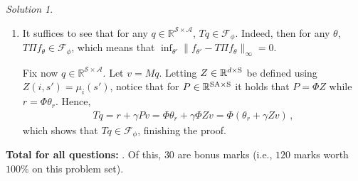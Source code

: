 \documentclass{article}
\newcommand{\R}{\mathbb{R}}
\DeclareMathOperator*{\1}{\mathbbm{1}}
\newcommand{\cF}{\mathcal{F}}
\newcommand{\0}{\mathbf{0}}
\newcounter{DocPoints} %
\theoremstyle{definition}
\newtheorem{question}{Question}
\theoremstyle{remark}
\newtheorem*{solution*}{Solution}
\theoremstyle{theorem}
\newcommand{\cS}{\mathcal{S}}
\newcommand{\cA}{\mathcal{A}}
\begin{document}
\begin{solution*}
\begin{enumerate}
\item 
It suffices to see that for any $q\in \R^{\cS \times \cA}$, $T q\in \cF_{\phi}$. Indeed, then for any $\theta$, $T\Pi f_\theta\in \cF_{\phi}$, which means that $\inf_{\theta'} \| f_{\theta'} - T \Pi f_{\theta} \|_\infty=0$.

Fix now $q\in \R^{\cS\times \cA}$. Let $v = Mq$.
Letting $Z\in \R^{d\times \nS}$ be defined using $Z(i,s') = \mu_i(s')$, notice that 
for $P\in \R^{\nS \nA \times \nS}$ it holds that 
$P =\Phi Z$ while $r = \Phi \theta_r$.
Hence,
\begin{align*}
T q = r + \gamma P v  =\Phi \theta_r + \gamma \Phi Z v = \Phi (\theta_r + \gamma Z v)\,,
\end{align*}
which shows that $Tq \in \cF_{\phi}$, finishing the proof.
\end{enumerate}
\end{solution*}




\bigskip
\bigskip

\noindent
\textbf{
Total for all questions: }.
Of this, $30$ are bonus marks (i.e., $120$ marks worth $100\%$ on this problem set).
\end{document}
